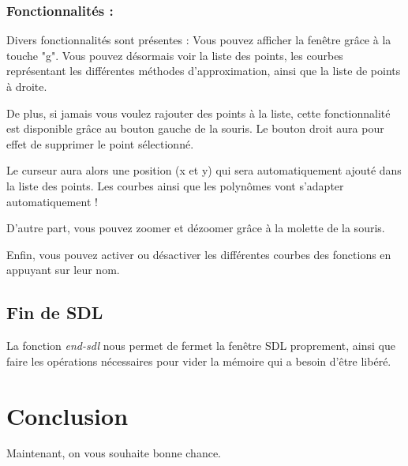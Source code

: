 \documentclass[letter]{article}
\begin{document}
\subsubsection{Fonctionnalités :}
\label{sec:orgc9abc89}

Divers fonctionnalités sont présentes :
Vous pouvez afficher la fenêtre grâce à la touche "g". Vous pouvez désormais voir la liste des points, les courbes représentant les différentes méthodes d'approximation, ainsi que la liste de points à droite.

De plus, si jamais vous voulez rajouter des points à la liste, cette fonctionnalité est disponible grâce au bouton gauche de la souris. Le bouton droit aura pour effet de supprimer le point sélectionné.

Le curseur aura alors une position (x et y) qui sera automatiquement ajouté dans la liste des points. Les courbes ainsi que les polynômes vont s'adapter automatiquement !

D'autre part, vous pouvez zoomer et dézoomer grâce à la molette de la souris.

Enfin, vous pouvez activer ou désactiver les différentes courbes des fonctions en appuyant sur leur nom. 


\subsection{Fin de SDL}
\label{sec:org61c6735}

La fonction \emph{end-sdl} nous permet de fermet la fenêtre SDL proprement, ainsi que faire les opérations nécessaires pour vider la mémoire qui a besoin d'être libéré.






\section{Conclusion}
\label{sec:org7c249da}

Maintenant, on vous souhaite bonne chance.
\end{document}
